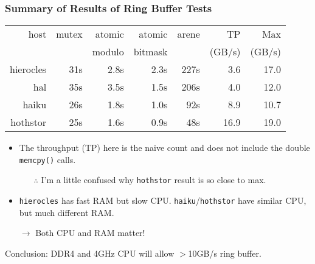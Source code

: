 \documentclass[xcolor=dvipsnames]{beamer}
\begin{document}
\begin{frame}[fragile]
  \frametitle{Summary of Results of Ring Buffer Tests}
  \begin{center}
    \begin{tabular}[h]{|r||r|r|r||r|r|r|}
      \hline
      host&mutex&atomic&atomic&arene&TP     & Max \\
          &     &modulo&bitmask&    & (GB/s)& (GB/s)\\
      \hline
      hierocles & 31s & 2.8s & 2.3s & 227s & 3.6 & 17.0 \\
      hal       & 35s & 3.5s & 1.5s & 206s & 4.0 & 12.0 \\
      haiku     & 26s & 1.8s & 1.0s &  92s & 8.9 & 10.7 \\
      hothstor  & 25s & 1.6s & 0.9s &  48s & 16.9& 19.0 \\
      \hline
    \end{tabular}
  \end{center}
  \begin{itemize}\footnotesize
  \item The throughput (TP) here is the naive count and does not include
    the double \texttt{memcpy()} calls.
    \begin{itemize}\scriptsize
    \item[$\therefore$] I'm a little confused why \texttt{hothstor} result is so
      close to max.
    \end{itemize}
  \item \texttt{hierocles} has fast RAM but slow CPU.
    \texttt{haiku}/\texttt{hothstor} have similar CPU, but much
    different RAM.
  \item[$\to$] Both CPU and RAM matter!
  \end{itemize}
  Conclusion: DDR4 and 4GHz CPU will allow $>$10GB/s ring buffer.

\end{frame}
\end{document}
